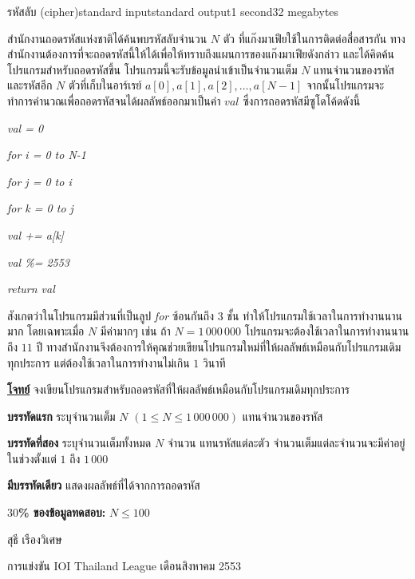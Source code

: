 \documentclass[11pt,a4paper]{article}
\begin{document}
\begin{problem}{รหัสลับ (cipher)}{standard input}{standard output}{1 second}{32 megabytes}

สำนักงานถอดรหัสแห่งชาติได้ค้นพบรหัสลับจำนวน $N$ ตัว ที่แก๊งมาเฟียใช้ในการติดต่อสื่อสารกัน ทางสำนักงานต้องการที่จะถอดรหัสนี้ให้ได้เพื่อให้ทราบถึงแผนการของแก๊งมาเฟียดังกล่าว และได้คิดค้นโปรแกรมสำหรับถอดรหัสขึ้น โปรแกรมนี้จะรับข้อมูลนำเข้าเป็นจำนวนเต็ม $N$ แทนจำนวนของรหัส และรหัสอีก $N$ ตัวที่เก็บในอาร์เรย์ $a[0], a[1], a[2], …, a[N-1]$ จากนั้นโปรแกรมจะทำการคำนวณเพื่อถอดรหัสจนได้ผลลัพธ์ออกมาเป็นค่า $val$ ซึ่งการถอดรหัสมีซูโดโค้ดดังนี้

\quad \quad \textit{val = 0}

\quad \quad \textit{for i = 0 to N-1}

\quad \quad \quad \textit{for j = 0 to i}

\quad \quad \quad \quad \textit{for k = 0 to j}

\quad \quad \quad \quad \quad \textit{val += a[k]}

 \quad \quad \textit{val \%= 2553}

\quad \quad  \textit{return val}

สังเกตว่าในโปรแกรมมีส่วนที่เป็นลูป \textit{for} ซ้อนกันถึง $3$ ชั้น ทำให้โปรแกรมใช้เวลาในการทำงานนานมาก โดยเฉพาะเมื่อ $N$ มีค่ามากๆ เช่น ถ้า $N = 1\,000\,000$ โปรแกรมจะต้องใช้เวลาในการทำงานนานถึง $11$ ปี ทางสำนักงานจึงต้องการให้คุณช่วยเขียนโปรแกรมใหม่ที่ให้ผลลัพธ์เหมือนกับโปรแกรมเดิมทุกประการ แต่ต้องใช้เวลาในการทำงานไม่เกิน $1$ วินาที

\bigskip
\underline{\textbf{โจทย์}}  จงเขียนโปรแกรมสำหรับถอดรหัสที่ให้ผลลัพธ์เหมือนกับโปรแกรมเดิมทุกประการ



\InputFile

\textbf{บรรทัดแรก} ระบุจำนวนเต็ม $N$ $(1 \leq N \leq 1\,000\,000)$ แทนจำนวนของรหัส

\textbf{บรรทัดที่สอง} ระบุจำนวนเต็มทั้งหมด $N$ จำนวน แทนรหัสแต่ละตัว จำนวนเต็มแต่ละจำนวนจะมีค่าอยู่ในช่วงตั้งแต่ $1$ ถึง $1\,000$


\OutputFile

\textbf{มีบรรทัดเดียว} แสดงผลลัพธ์ที่ได้จากการถอดรหัส


\Examples

\begin{example}
%
%
\end{example}

\Scoring

\textbf{$30$\% ของข้อมูลทดสอบ:} $N \leq 100$
  
\Source

สุธี เรืองวิเศษ

การแข่งขัน IOI Thailand League เดือนสิงหาคม 2553

\end{problem}
\end{document}
